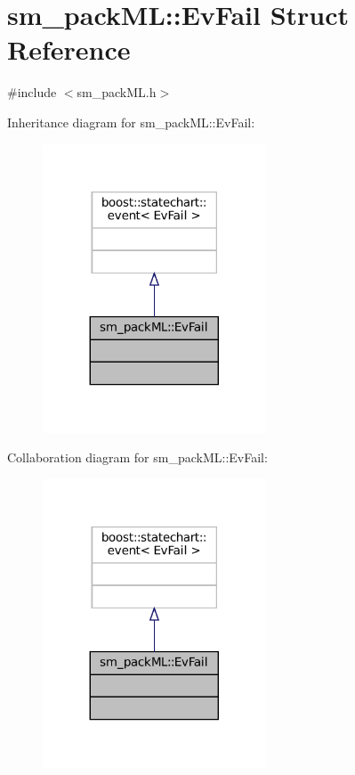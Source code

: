 \hypertarget{structsm__packML_1_1EvFail}{}\section{sm\+\_\+pack\+ML\+:\+:Ev\+Fail Struct Reference}
\label{structsm__packML_1_1EvFail}


{\ttfamily \#include $<$sm\+\_\+pack\+M\+L.\+h$>$}



Inheritance diagram for sm\+\_\+pack\+ML\+:\+:Ev\+Fail\+:
\nopagebreak
\begin{figure}[H]
\begin{center}
\leavevmode
\includegraphics[width=188pt]{structsm__packML_1_1EvFail__inherit__graph}
\end{center}
\end{figure}


Collaboration diagram for sm\+\_\+pack\+ML\+:\+:Ev\+Fail\+:
\nopagebreak
\begin{figure}[H]
\begin{center}
\leavevmode
\includegraphics[width=188pt]{structsm__packML_1_1EvFail__coll__graph}
\end{center}
\end{figure}


